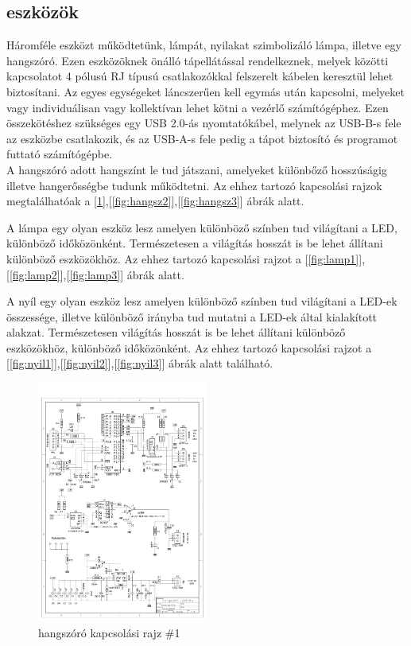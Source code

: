 \documentclass[tocnopagenum]{thesis-ekf}
\theoremstyle{definition}
\theoremstyle{remark}
\begin{document}
	\subsection*{eszközök}
	Háromféle eszközt működtetünk, lámpát, nyilakat szimbolizáló lámpa, illetve egy hangszóró.
	Ezen eszközöknek önálló tápellátással rendelkeznek, melyek közötti kapcsolatot 4 pólusú RJ típusú csatlakozókkal felszerelt kábelen keresztül lehet biztosítani. Az egyes egységeket láncszerűen kell egymás után kapcsolni, melyeket vagy individuálisan vagy kollektívan lehet kötni a vezérlő számítógéphez. Ezen összekötéshez szükséges egy USB 2.0-ás nyomtatókábel, melynek az USB-B-s fele az eszközbe csatlakozik, és az USB-A-s fele pedig a tápot biztosító és programot futtató számítógépbe.
	\\  
	A hangszóró adott hangszínt le tud játszani, amelyeket különbőző hosszúságig illetve hangerősségbe tudunk működtetni.
	Az ehhez tartozó kapcsolási rajzok megtalálhatóak a [\ref{fig:hangsz1}],[\ref{fig:hangsz2}],[\ref{fig:hangsz3}] ábrák alatt.
	\par
	A lámpa egy olyan eszköz lesz amelyen különböző színben tud világítani a LED, különböző időközönként. Természetesen a világítás hosszát is be lehet állítani különböző eszközökhöz.
	Az ehhez tartozó kapcsolási rajzot a [\ref{fig:lamp1}],[\ref{fig:lamp2}],[\ref{fig:lamp3}] ábrák alatt.
	\par
	A nyíl egy olyan eszköz lesz amelyen különböző színben tud világítani a LED-ek összessége, illetve különböző irányba tud mutatni a LED-ek által kialakított alakzat.  Természetesen  világítás hosszát is be lehet állítani különböző eszközökhöz, különböző időközönként.
Az ehhez tartozó kapcsolási rajzot a [\ref{fig:nyil1}],[\ref{fig:nyil2}],[\ref{fig:nyil3}] ábrák alatt található.\medskip
\\
	\begin{figure}[h!]
	
	\centering
	\includegraphics[page=1,width=0.5\textwidth]{SLH}
	\caption{hangszóró kapcsolási rajz \#1}
	\label{fig:hangsz1}
	
	\end{figure}
\end{document}
